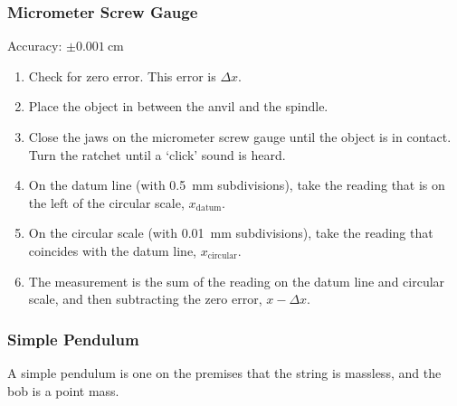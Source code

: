 \documentclass[../main.tex]{subfiles}
\begin{document}
		\subsubsection*{Micrometer Screw Gauge}
		Accuracy: \(\pm \SI{0.001}{\centi\meter}\)
		\begin{enumerate}
			\item Check for zero error. This error is \(\Delta x\).
			\item Place the object in between the anvil and the spindle.
			\item Close the jaws on the micrometer screw gauge until the object is in contact. Turn  the ratchet until a `click' sound is heard.
			\item On the datum line (with \SI{0.5}{\milli\meter} subdivisions), take the reading that is on the left of the circular scale, \(x_\mathrm{datum}\).
			\item On the circular scale (with \SI{0.01}{\milli\meter} subdivisions), take the reading that coincides with the datum line, \(x_\mathrm{circular}\).
			\item The measurement is the sum of the reading on the datum line and circular scale, and then subtracting the zero error, \(x-\Delta x\).
		\end{enumerate}
	
		\subsubsection{Simple Pendulum}
		A simple pendulum is one on the premises that the string is massless, and the bob is a point mass.
		
		\begin{center}
		\end{center}
		
\end{document}
